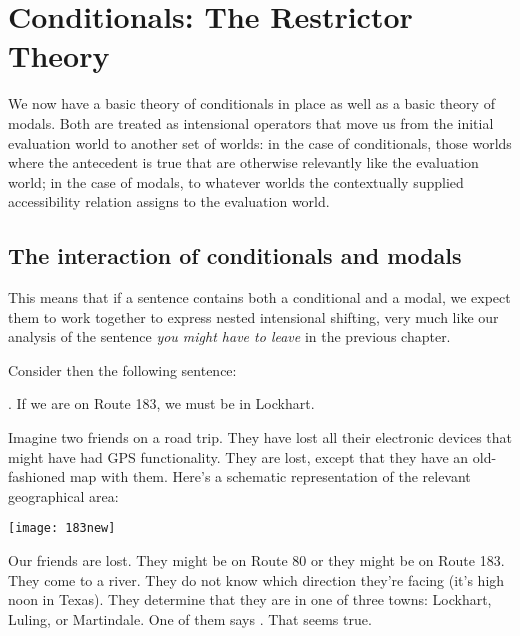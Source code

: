 \chapter{Conditionals: The Restrictor Theory}\label{cha:conditionals-restrictor} %


\minitoc

We now have a basic theory of conditionals in place as well as a basic theory of modals. Both are treated as intensional operators that move us from the initial evaluation world to another set of worlds: in the case of conditionals, those worlds where the antecedent is true that are otherwise relevantly like the evaluation world; in the case of modals, to whatever worlds the contextually supplied accessibility relation assigns to the evaluation world.

\section{The interaction of conditionals and modals}

This means that if a sentence contains both a conditional and a modal, we expect them to work together to express nested intensional shifting, very much like our analysis of the sentence \emph{you might have to leave} in the previous chapter.

Consider then the following sentence:

\ex. \label{ex:lockhart-must}If we are on Route 183, we must be in Lockhart.

Imagine two friends on a road trip. They have lost all their electronic devices that might have had GPS functionality. They are lost, except that they have an old-fashioned map with them. Here's a schematic representation of the relevant geographical area:

    \texttt{[image: 183new]}

Our friends are lost. They might be on Route 80 or they might be on Route 183. They come to a river. They do not know which direction they're facing (it's high noon in Texas). They determine that they are in one of three towns: Lockhart, Luling, or Martindale. One of them says \Last. That seems true.

